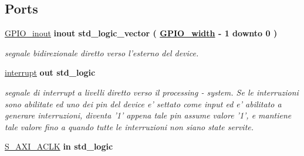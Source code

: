 \subsection*{Ports}
 \begin{DoxyCompactItemize}
\item 
\hypertarget{group___a_x_i-internal_ga8829699d739ef35a4c5da396ffd38387}{\hyperlink{group___a_x_i-internal_ga8829699d739ef35a4c5da396ffd38387}{G\+P\+I\+O\+\_\+inout}  {\bfseries {\bfseries \textcolor{vhdlchar}{inout}\textcolor{vhdlchar}{ }}} {\bfseries \textcolor{vhdlchar}{std\+\_\+logic\+\_\+vector}\textcolor{vhdlchar}{ }\textcolor{vhdlchar}{(}\textcolor{vhdlchar}{ }\textcolor{vhdlchar}{ }\textcolor{vhdlchar}{ }\textcolor{vhdlchar}{ }{\bfseries \hyperlink{group___a_x_i-internal_ga0b52ca75e9a6093b2b60d5e851803069}{G\+P\+I\+O\+\_\+width}} \textcolor{vhdlchar}{-\/}\textcolor{vhdlchar}{ } \textcolor{vhdldigit}{1} \textcolor{vhdlchar}{ }\textcolor{vhdlchar}{downto}\textcolor{vhdlchar}{ }\textcolor{vhdlchar}{ } \textcolor{vhdldigit}{0} \textcolor{vhdlchar}{ }\textcolor{vhdlchar}{)}\textcolor{vhdlchar}{ }} }\label{group___a_x_i-internal_ga8829699d739ef35a4c5da396ffd38387}

\begin{DoxyCompactList}\small\item\em segnale bidirezionale diretto verso l'esterno del device. \end{DoxyCompactList}\item 
\hypertarget{group___a_x_i-internal_ga5b78f3e3edfaf6e8ec79031b9e631e9d}{\hyperlink{group___a_x_i-internal_ga5b78f3e3edfaf6e8ec79031b9e631e9d}{interrupt}  {\bfseries {\bfseries \textcolor{vhdlchar}{out}\textcolor{vhdlchar}{ }}} {\bfseries \textcolor{vhdlchar}{std\+\_\+logic}\textcolor{vhdlchar}{ }} }\label{group___a_x_i-internal_ga5b78f3e3edfaf6e8ec79031b9e631e9d}

\begin{DoxyCompactList}\small\item\em segnale di interrupt a livelli diretto verso il processing -\/ system. Se le interruzioni sono abilitate ed uno dei pin del device e' settato come input ed e' abilitato a generare interruzioni, diventa '1' appena tale pin assume valore '1', e mantiene tale valore fino a quando tutte le interruzioni non siano state servite. \end{DoxyCompactList}\item 
\hypertarget{group___a_x_i-internal_ga3f54d782a88290bdaa6baffd7cd84ab4}{\hyperlink{group___a_x_i-internal_ga3f54d782a88290bdaa6baffd7cd84ab4}{S\+\_\+\+A\+X\+I\+\_\+\+A\+C\+L\+K}  {\bfseries {\bfseries \textcolor{vhdlchar}{in}\textcolor{vhdlchar}{ }}} {\bfseries \textcolor{vhdlchar}{std\+\_\+logic}\textcolor{vhdlchar}{ }} }\label{group___a_x_i-internal_ga3f54d782a88290bdaa6baffd7cd84ab4}


\end{DoxyCompactItemize}
